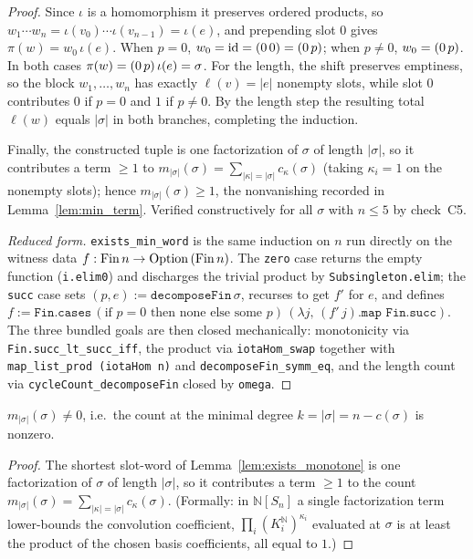 \begin{proof}
Since $\iota$ is a homomorphism it preserves ordered products, so
$w_1\cdots w_n=\iota(v_0)\cdots\iota(v_{n-1})=\iota(e)$, and prepending slot $0$
gives $\pi(w)=w_0\,\iota(e)$. When $p=0$, $w_0=\mathrm{id}=(0\,0)=(0\,p)$; when
$p\neq0$, $w_0=(0\,p)$. In both cases $\pi(w)=(0\,p)\,\iota(e)=\sigma$.
For the length, the shift preserves emptiness, so the block $w_1,\dots,w_n$ has
exactly $\ell(v)=|e|$ nonempty slots, while slot $0$ contributes $0$ if $p=0$ and
$1$ if $p\neq0$. By the length step the resulting total $\ell(w)$ equals $|\sigma|$
in both branches, completing the induction.

Finally, the constructed tuple is one factorization of $\sigma$ of length
$|\sigma|$, so it contributes a term $\ge1$ to
$m_{|\sigma|}(\sigma)=\sum_{|\kappa|=|\sigma|}c_\kappa(\sigma)$ (taking $\kappa_i=1$
on the nonempty slots); hence $m_{|\sigma|}(\sigma)\ge1$, the nonvanishing recorded
in Lemma~\ref{lem:min_term}. Verified constructively for all $\sigma$ with
$n\le5$ by check~C5.

\medskip\noindent\emph{Reduced form.} \texttt{exists\_min\_word} is the same
induction on $n$ run directly on the witness data $f:\mathrm{Fin}\,n\to\mathrm{Option}\,(\mathrm{Fin}\,n)$.
The \texttt{zero} case returns the empty function (\texttt{i.elim0}) and discharges
the trivial product by \texttt{Subsingleton.elim}; the \texttt{succ} case sets
$(p,e):=\texttt{decomposeFin}\,\sigma$, recurses to get $f'$ for $e$, and defines
$f:=\texttt{Fin.cases}\,(\text{if }p=0\text{ then none else some }p)\,(\lambda j,\,(f'\,j).\texttt{map Fin.succ})$.
The three bundled goals are then closed mechanically: monotonicity via
\texttt{Fin.succ\_lt\_succ\_iff}, the product via \texttt{iotaHom\_swap} together with
\texttt{map\_list\_prod (iotaHom n)} and \texttt{decomposeFin\_symm\_eq}, and the length
count via \texttt{cycleCount\_decomposeFin} closed by \texttt{omega}.
\end{proof}

\begin{lemma}\label{lem:min_term}
\leanok
{}
$m_{|\sigma|}(\sigma)\ne0$, i.e.\ the count at the minimal degree $k=|\sigma|=n-c(\sigma)$
is nonzero.
\end{lemma}
\begin{proof}
\leanok
{}
The shortest slot-word of Lemma~\ref{lem:exists_monotone} is one factorization of
$\sigma$ of length $|\sigma|$, so it contributes a term $\ge1$ to the count
$m_{|\sigma|}(\sigma)=\sum_{|\kappa|=|\sigma|}c_\kappa(\sigma)$. (Formally: in
$\mathbb N[S_n]$ a single factorization term lower-bounds the convolution coefficient,
$\prod_i(K_i^{\mathbb N})^{\kappa_i}$ evaluated at $\sigma$ is at least the product of the
chosen basis coefficients, all equal to $1$.)
\end{proof}

